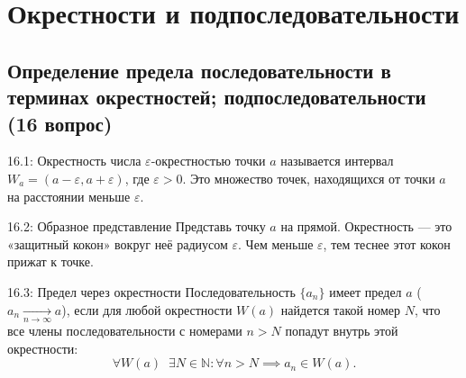 \documentclass[a4paper,12pt]{article}
\begin{document}
	
	
	\newpage
	\section{Окрестности и подпоследовательности}
	
	\subsection{Определение предела последовательности в терминах окрестностей; подпоследовательности (16 вопрос)}
	
	\begin{definitionbox}{16.1: Окрестность числа}
		$\varepsilon$-окрестностью точки $a$ называется интервал $W_a = (a - \varepsilon, a + \varepsilon)$, где $\varepsilon > 0$. Это множество точек, находящихся от точки $a$ на расстоянии меньше $\varepsilon$.
	\end{definitionbox}
	
	\begin{center}
	\end{center}
	
	\begin{notebook}{16.2: Образное представление}
		Представь точку $a$ на прямой. Окрестность — это «защитный кокон» вокруг неё радиусом $\varepsilon$. Чем меньше $\varepsilon$, тем теснее этот кокон прижат к точке.
	\end{notebook}
	
	\begin{definitionbox}{16.3: Предел через окрестности}
		Последовательность $\{a_n\}$ имеет предел $a$ ($a_n \xrightarrow[n \to \infty]{} a$), если для любой окрестности $W(a)$ найдется такой номер $N$, что все члены последовательности с номерами $n > N$ попадут внутрь этой окрестности:
		\[ \forall W(a) \;\; \exists N \in \mathbb{N} \colon \forall n > N \implies a_n \in W(a) \text{.} \]
	\end{definitionbox}
	
\end{document}
